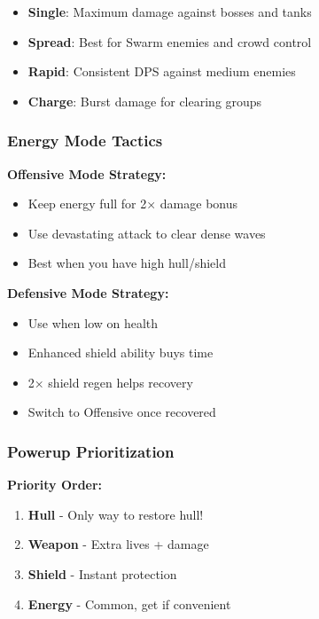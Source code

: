 \documentclass[11pt,a4paper]{article}
\begin{document}
\begin{itemize}[leftmargin=*]
    \item \textbf{Single}: Maximum damage against bosses and tanks
    \item \textbf{Spread}: Best for Swarm enemies and crowd control
    \item \textbf{Rapid}: Consistent DPS against medium enemies
    \item \textbf{Charge}: Burst damage for clearing groups
\end{itemize}

\subsubsection{Energy Mode Tactics}

\begin{tcolorbox}[mybox]
\textbf{Offensive Mode Strategy:}
\begin{itemize}[nosep]
    \item Keep energy full for 2× damage bonus
    \item Use devastating attack to clear dense waves
    \item Best when you have high hull/shield
\end{itemize}

\textbf{Defensive Mode Strategy:}
\begin{itemize}[nosep]
    \item Use when low on health
    \item Enhanced shield ability buys time
    \item 2× shield regen helps recovery
    \item Switch to Offensive once recovered
\end{itemize}
\end{tcolorbox}

\subsubsection{Powerup Prioritization}

\textbf{Priority Order:}
\begin{enumerate}[nosep]
    \item \textcolor{red}{\faHeart} \textbf{Hull} - Only way to restore hull!
    \item \textcolor{orange}{\faStar} \textbf{Weapon} - Extra lives + damage
    \item \textcolor{cyan}{\faCircle} \textbf{Shield} - Instant protection
    \item \textcolor{yellow}{\faLightbulb} \textbf{Energy} - Common, get if convenient
\end{enumerate}
\end{document}
